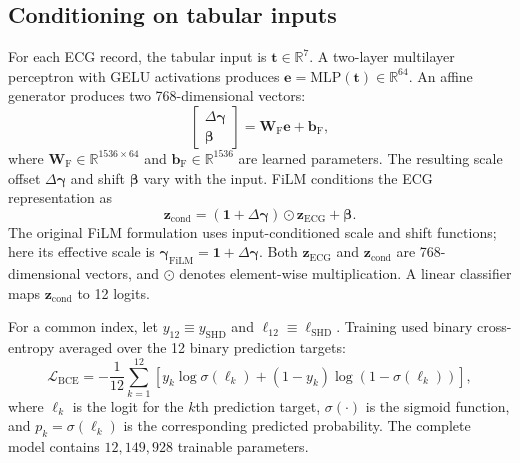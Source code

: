 \subsection{Conditioning on tabular inputs}
\label{sec:film}

For each ECG record, the tabular input is $\mathbf{t}\in\mathbb{R}^{7}$. A two-layer multilayer perceptron with GELU activations produces $\mathbf{e}=\mathrm{MLP}(\mathbf{t})\in\mathbb{R}^{64}$. An affine generator produces two 768-dimensional vectors:
\begin{equation}
\begin{bmatrix}\Delta\boldsymbol{\gamma}\\\boldsymbol{\beta}\end{bmatrix}
=\mathbf{W}_{\mathrm{F}}\mathbf{e}+\mathbf{b}_{\mathrm{F}},
\label{eq:film_generator}
\end{equation}
where $\mathbf{W}_{\mathrm{F}}\in\mathbb{R}^{1536\times64}$ and $\mathbf{b}_{\mathrm{F}}\in\mathbb{R}^{1536}$ are learned parameters. The resulting scale offset $\Delta\boldsymbol{\gamma}$ and shift $\boldsymbol{\beta}$ vary with the input. FiLM conditions the ECG representation as
\begin{equation}
\mathbf{z}_{\mathrm{cond}}=
(\mathbf{1}+\Delta\boldsymbol{\gamma})\odot\mathbf{z}_{\mathrm{ECG}}+\boldsymbol{\beta}.
\label{eq:film}
\end{equation}
The original FiLM formulation uses input-conditioned scale and shift functions\cite{perez2018film}; here its effective scale is $\boldsymbol{\gamma}_{\mathrm{FiLM}}=\mathbf{1}+\Delta\boldsymbol{\gamma}$. Both $\mathbf{z}_{\mathrm{ECG}}$ and $\mathbf{z}_{\mathrm{cond}}$ are 768-dimensional vectors, and $\odot$ denotes element-wise multiplication. A linear classifier maps $\mathbf{z}_{\mathrm{cond}}$ to 12 logits.

For a common index, let $y_{12}\equiv y_{\mathrm{SHD}}$ and $\ell_{12}\equiv \ell_{\mathrm{SHD}}$. Training used binary cross-entropy averaged over the 12 binary prediction targets:
\begin{equation}
\mathcal{L}_{\mathrm{BCE}}=-\frac{1}{12}
\sum_{k=1}^{12}
\left[y_k\log\sigma(\ell_k)+(1-y_k)\log(1-\sigma(\ell_k))\right],
\label{eq:bce}
\end{equation}
where $\ell_k$ is the logit for the $k$th prediction target, $\sigma(\cdot)$ is the sigmoid function, and $p_k=\sigma(\ell_k)$ is the corresponding predicted probability. The complete model contains $12{,}149{,}928$ trainable parameters.

